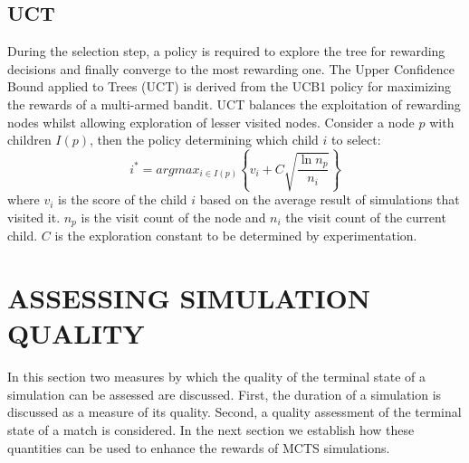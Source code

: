 \documentclass{ecai2014}
\begin{document}
\subsection{UCT}
\label{subsec:uct}
During the selection step, a policy is required to explore the tree for rewarding decisions and finally converge to the most rewarding one. The Upper Confidence Bound applied to Trees (UCT) \cite{kocsis2006bandit} is derived from the UCB1 policy \cite{auer2002using} for maximizing the rewards of a multi-armed bandit. UCT balances the exploitation of rewarding nodes whilst allowing exploration of lesser visited nodes. Consider a node $p$ with children $I(p)$, then the policy determining which child $i$ to select:
\begin{equation}
\label{eq:uct}
i^* = argmax_{i \in I(p)}\left\{ v_i + C \sqrt{ \frac{\ln{n_p}}{n_i}}\right\}
\end{equation}
where $v_i$ is the score of the child $i$ based on the average result of simulations that visited it. $n_p$ is the visit count of the node and $n_i$ the visit count of the current child. $C$ is the exploration constant to be determined by experimentation.

\section{ASSESSING SIMULATION QUALITY}
\label{sec:poqual}
In this section two measures by which the quality of the terminal state of a simulation can be assessed are discussed. First, the duration of a simulation is discussed as a measure of its quality. Second, a quality assessment of the terminal state of a match is considered. In the next section we establish how these quantities can be used to enhance the rewards of MCTS simulations.
\end{document}
